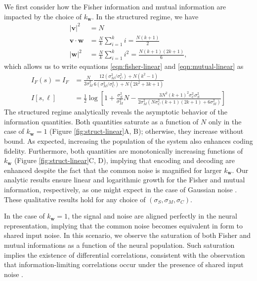 \documentclass[11pt]{article}
\begin{document}
	We first consider how the Fisher information and mutual information are impacted by the choice of $k_{\mathbf{w}}$. In the structured regime, we have 
	\begin{align}
		|\mathbf{v}|^2 &= N \\
		\mathbf{v}\cdot\mathbf{w} &= \frac{N}{k} \sum_{i=1}^k i = \frac{N(k+1)}{2} \\
		|\mathbf{w}|^2 &= \frac{N}{k}\sum_{i=1}^k i^2 = \frac{N(k+1)(2k+1)}{6},
	\end{align}
	which allows us to write equations \ref{eqn:fisher-linear} and \ref{eqn:mutual-linear} as 
	\begin{align}
		I_F(s) = I_F &= \frac{N}{2\sigma_M^2} \frac{12 (\sigma_M^2/\sigma_C^2) + N  (k^2-1)}{6(\sigma_M^2/\sigma_C^2)+ N(2k^2+3k+1)} \\
		I[s, \boldsymbol{\ell}] &= \frac{1}{2} \log\left[1 + \frac{\sigma_S^2}{\sigma_M^2} N - \frac{3N^2(k+1)^2\sigma_C^2 \sigma_S^2}{2\sigma_M^2 \left(N\sigma_C^2(k+1)(2k+1) + 6 \sigma_M^2\right)}\right]
	\end{align}
	The structured regime analytically reveals the asymptotic behavior of the information quantities. Both quantities saturate as a function of $N$  only in the case of $k_{\mathbf{w}}=1$ (Figure \ref{fig:struct-linear}A, B); otherwise, they increase without bound. As expected, increasing the population of the system also enhances coding fidelity. Furthermore, both quantities are monotonically increasing functions of $k_{\mathbf{w}}$ (Figure \ref{fig:struct-linear}C, D), implying that encoding and decoding are enhanced despite the fact that the common noise is magnified for larger $k_{\mathbf{w}}$. Our analytic results ensure linear and logarithmic growth for the Fisher and mutual information, respectively, as one might expect in the case of Gaussian noise \cite{Brunel1998}. These qualitative results hold for any choice of $(\sigma_S, \sigma_M, \sigma_C)$.
	
	In the case of $k_{\mathbf{w}}=1$, the signal and noise are aligned perfectly in the neural representation, implying that the common noise becomes equivalent in form to shared input noise. In this scenario, we observe the saturation of both Fisher and mutual informations as a function of the neural population. Such saturation implies the existence of differential correlations, consistent with the observation that information-limiting correlations occur under the presence of shared input noise \cite{Moreno-Bote2014}.
	
\end{document}
